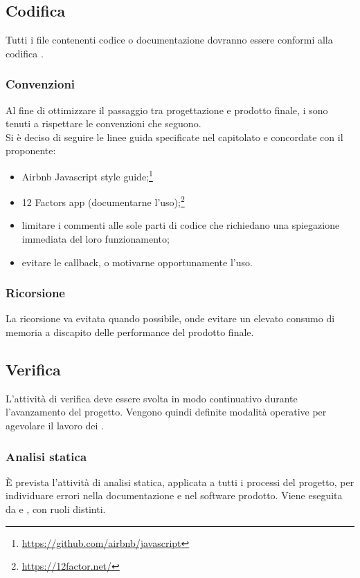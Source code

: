 \subsection{Codifica}
Tutti i file contenenti codice o documentazione dovranno essere conformi alla codifica .

\subsubsection{Convenzioni} \label{sec:convenzioni}
Al fine di ottimizzare il passaggio tra progettazione e prodotto finale, i \Programmatori{} sono tenuti a rispettare le convenzioni che seguono.\\
Si è deciso di seguire le linee guida specificate nel capitolato e concordate con il proponente:
\begin{itemize}
	\item Airbnb Javascript style guide;\footnote{\url{https://github.com/airbnb/javascript}}
	\item 12 Factors app (documentarne l'uso);\footnote{\url{https://12factor.net/}}
	\item limitare i commenti alle sole parti di codice che richiedano una spiegazione immediata del loro funzionamento;
	\item evitare le callback, o motivarne opportunamente l’uso.
\end{itemize}
\subsubsection{Ricorsione}
La ricorsione va evitata quando possibile, onde evitare un elevato consumo di memoria a discapito delle performance del prodotto finale. 

\subsection{Verifica}
L’attività di verifica deve essere svolta in modo continuativo durante l'avanzamento del progetto. Vengono quindi definite modalità operative per agevolare il lavoro dei \Verificatori.

\subsubsection{Analisi statica}
È prevista l'attività di analisi statica, applicata a tutti i processi del progetto, per individuare errori nella documentazione e nel software prodotto. Viene eseguita da \Verificatori{} e \Programmatori{}, con ruoli distinti.

